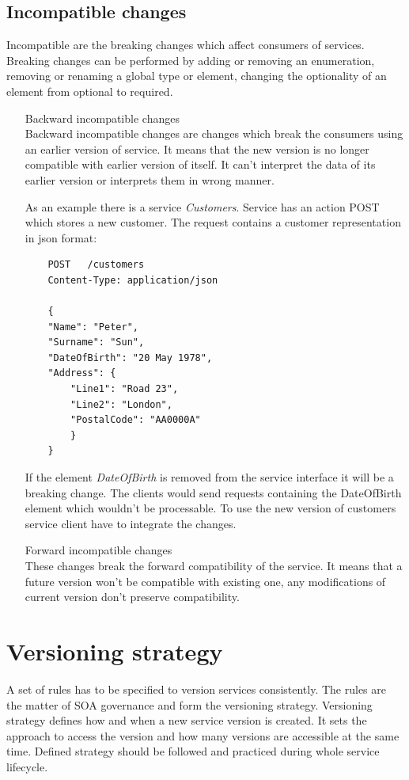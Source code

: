 \subsection{Incompatible changes}
  Incompatible are the breaking changes which affect consumers of services. Breaking changes can be performed by adding or removing an enumeration, removing or renaming a global type or element, changing the optionality of an element from optional to required.
  \begin{enumerate} 
    \item[Backward incompatible changes]  \hfill \\
    Backward incompatible changes are changes which break the consumers using an earlier version of service. It means that the new version is no longer compatible with earlier version of itself. It can't interpret the data of its earlier version or interprets them in wrong manner.
    
    As an example there is a service \emph{Customers}. Service has an action POST which stores a new customer. The request contains a customer representation in json format: 
    
\begin{lstlisting}
    POST   /customers
    Content-Type: application/json
    
    {
    "Name": "Peter",
    "Surname": "Sun",
    "DateOfBirth": "20 May 1978",
    "Address": {
        "Line1": "Road 23",
        "Line2": "London",
        "PostalCode": "AA0000A"
        }
    }
\end{lstlisting}

If the element \emph{DateOfBirth} is removed from the service interface it will be a breaking change. The clients would send requests containing the DateOfBirth element which wouldn't be processable. To use the new version of customers service client have to integrate the changes. 

    \item[Forward incompatible changes] \hfill \\
    These changes break the forward compatibility of the service. It means that a future version won't be compatible with existing one, any modifications of current version don't preserve compatibility.
  \end{enumerate}

\section{Versioning strategy}
\label{sec:version-strategy}
A set of rules has to be specified to version services consistently. The rules are the matter of SOA governance and form the versioning strategy. Versioning strategy defines how and when a new service version is created. It sets the approach to access the version and how many versions are accessible at the same time. Defined strategy should be followed and practiced during whole service lifecycle. 

